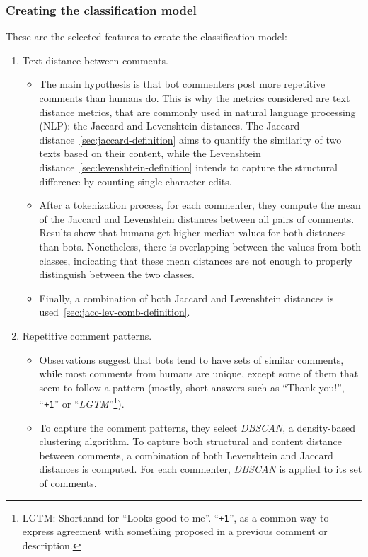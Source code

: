 \documentclass[a4paper, 12pt]{book}
\begin{document}
\subsubsection{Creating the classification model}
\label{sssec:golzadeh-classification}

These are the selected features to create the classification model:

\begin{enumerate}
    \item Text distance between comments.
    \begin{itemize}
        \item The main hypothesis is that bot commenters post more repetitive comments than humans do. This is why the metrics considered are text distance metrics, that are commonly used in natural language processing (NLP): the Jaccard and Levenshtein distances. The Jaccard distance~\ref{sec:jaccard-definition} aims to quantify the similarity of two texts based on their content, while the Levenshtein distance~\ref{sec:levenshtein-definition} intends to capture the structural difference by counting single-character edits.
        \item After a tokenization process, for each commenter, they compute the mean of the Jaccard and Levenshtein distances between all pairs of comments. Results show that humans get higher median values for both distances than bots. Nonetheless, there is overlapping between the values from both classes, indicating that these mean distances are not enough to properly distinguish between the two classes.
        \item Finally, a combination of both Jaccard and Levenshtein distances is used~\ref{sec:jacc-lev-comb-definition}.
    \end{itemize}
    \item Repetitive comment patterns.
        \begin{itemize}
            \item Observations suggest that bots tend to have sets of similar comments, while most comments from humans are unique, except some of them that seem to follow a pattern (mostly, short answers such as ``Thank you!'', ``\texttt{+1}'' or ``\textit{LGTM}''\footnote{ LGTM: Shorthand for ``Looks good to me''. ``\texttt{+1}'', as a common way to express agreement with something proposed in a previous comment or description.}).
            \item To capture the comment patterns, they select \textit{DBSCAN}, a density-based clustering algorithm. To capture both structural and content distance between comments, a combination of both Levenshtein and Jaccard distances is computed. For each commenter, \textit{DBSCAN} is applied to its set of comments.

\end{itemize}
\end{enumerate}
\end{document}
